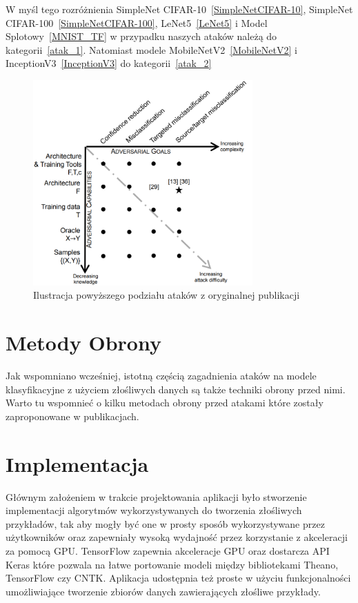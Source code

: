 \documentclass[
    left=2.5cm,         %
    right=2.5cm,        %
    top=2.5cm,          %
    bottom=3cm,         %
    bindingoffset=6mm,  %
    nohyphenation=false %
]{eiti/eiti-thesis}
\begin{document}
W myśl tego rozróżnienia SimpleNet CIFAR-10~\ref{SimpleNetCIFAR-10}, SimpleNet CIFAR-100~\ref{SimpleNetCIFAR-100},
LeNet5~\ref{LeNet5} i Model Splotowy~\ref{MNIST_TF} w przypadku naszych ataków należą do kategorii~\ref{atak_1}.
Natomiast modele MobileNetV2~\ref{MobileNetV2} i InceptionV3~\ref{InceptionV3} do kategorii~\ref{atak_2}

\begin{figure}[H]
    \begin{center}
        \includegraphics[width=0.75\textwidth]{eiti/attacks_taxonomy.png}
    \end{center}
    \caption{Ilustracja powyższego podziału ataków z oryginalnej publikacji~\cite{DBLP:journals/corr/PapernotMJFCS15}}
\end{figure}

\newpage

\section{Metody Obrony}
Jak wspomniano wcześniej, istotną częścią zagadnienia ataków na modele klasyfikacyjne z użyciem złośliwych danych są
także techniki obrony przed nimi. Warto tu wspomnieć o kilku metodach obrony przed atakami które zostały
zaproponowane w publikacjach.
\newpage

\section{Implementacja}
Głównym założeniem w trakcie projektowania aplikacji było stworzenie implementacji algorytmów wykorzystywanych do
tworzenia złośliwych przykładów, tak aby mogły być one w prosty sposób wykorzystywane przez użytkowników oraz zapewniały
wysoką wydajność przez korzystanie z akceleracji za pomocą GPU. TensorFlow zapewnia akceleracje GPU oraz dostarcza API
Keras które pozwala na łatwe portowanie modeli między bibliotekami Theano\cite{2016arXiv160502688short}, TensorFlow\cite{DBLP:journals/corr/AbadiABBCCCDDDG16} czy CNTK\cite{cntk}.
Aplikacja udostępnia też proste w użyciu funkcjonalności umożliwiające tworzenie zbiorów danych zawierających złośliwe przykłady.
\end{document}
